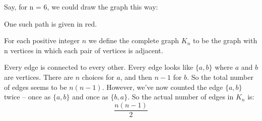 \documentclass[a4paper, 12pt]{exam}
\begin{document}
\begin{questions}
	\begin{solution}
	
		Say, for n = 6, we could draw the graph this way:
		\begin{center}
  	 \begin{adjustbox}{max width=0.6\textwidth}
			\end{adjustbox}
		\end{center}
		
		One such path is given in red.
	\end{solution}

\question
  For each positive integer $n$ we define the complete graph $K_n$ to be the graph with n vertices in which each pair of vertices is adjacent.~\cite{biggs02}

	\begin{solution}
		Every edge is connected to every other.
		Every edge looks like $\{a,b\}$ where $a$ and $b$ are vertices.
		There are $n$ choices for $a$, and then $n-1$ for $b$.
		So the total number of edges seems to be $n(n-1)$.
		However, we've now counted the edge $\{a,b\}$ twice -- once as $\{a,b\}$ and once as $\{b,a\}$.
		So the actual number of edges in $K_n$ is:
		$$ \frac{n(n-1)}{2}$$
	\end{solution}


\end{questions}
\end{document}
